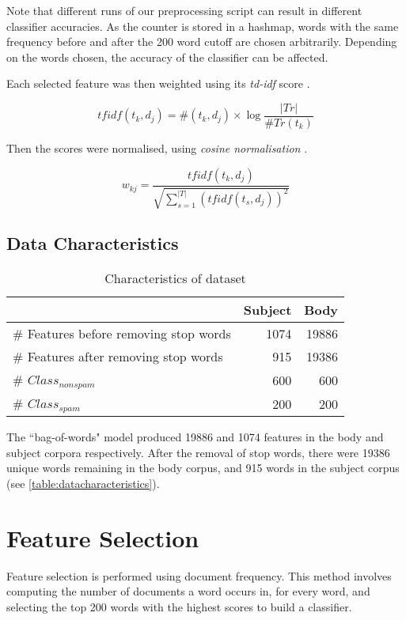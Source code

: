 \documentclass[10pt, a4paper]{article}
\begin{document}
Note that different runs of our preprocessing script can result in different classifier accuracies. As the counter is stored in a hashmap, words with the same frequency before and after the 200 word cutoff are chosen arbitrarily. Depending on the words chosen, the accuracy of the classifier can be affected.

Each selected feature was then weighted using its \emph{td-idf} score \cite{sebastiani}.

$$ tfidf(t_k, d_j) = \#(t_k, d_j) \times \log \frac{|Tr|}{\#Tr(t_k)} $$

Then the scores were normalised, using \emph{cosine normalisation} \cite{sebastiani}.

$$ w_{kj} = \frac{tfidf(t_k, d_j)}{\sqrt{\sum_{s=1}^{|T|} (tfidf(t_s, d_j))^2 }} $$

\subsection{Data Characteristics}

\setlength\extrarowheight{3pt}

\begin{table}[H]
\centering
\caption{Characteristics of dataset}
\begin{tabular}{@{}lrr@{}}
\toprule
& \textbf{Subject} & \textbf{Body} \\
\midrule
\# Features before removing stop words & 1074 & 19886 \\
\# Features after removing stop words & 915 & 19386 \\
\# $Class_{nonspam}$ & 600 & 600 \\
\# $Class_{spam}$ & 200 & 200 \\
\bottomrule
\end{tabular}
\label{table:datacharacteristics}
\end{table}

The ``bag-of-words" model produced 19886 and 1074 features in the body and subject corpora respectively. After the removal of stop words, there were 19386 unique words remaining in the body corpus, and 915 words in the subject corpus (see \autoref{table:datacharacteristics}).

\section{Feature Selection}

Feature selection is performed using document frequency. This method involves computing the number of documents a word occurs in, for every word, and selecting the top 200 words with the highest scores to build a classifier.
\end{document}
